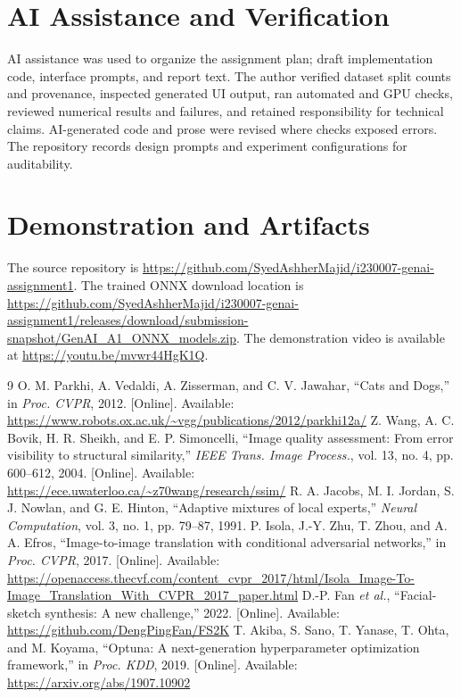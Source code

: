 \documentclass[conference]{IEEEtran}
\begin{document}
\appendices
\section{AI Assistance and Verification}
AI assistance was used to organize the assignment plan; draft implementation code, interface prompts, and report text. The author verified dataset split counts and provenance, inspected generated UI output, ran automated and GPU checks, reviewed numerical results and failures, and retained responsibility for technical claims. AI-generated code and prose were revised where checks exposed errors. The repository records design prompts and experiment configurations for auditability.

\section{Demonstration and Artifacts}
The source repository is \url{https://github.com/SyedAshherMajid/i230007-genai-assignment1}. The trained ONNX download location is \url{https://github.com/SyedAshherMajid/i230007-genai-assignment1/releases/download/submission-snapshot/GenAI_A1_ONNX_models.zip}. The demonstration video is available at \url{https://youtu.be/mvwr44HgK1Q}.

\begin{thebibliography}{9}
 O. M. Parkhi, A. Vedaldi, A. Zisserman, and C. V. Jawahar, ``Cats and Dogs,'' in \emph{Proc. CVPR}, 2012. [Online]. Available: \url{https://www.robots.ox.ac.uk/~vgg/publications/2012/parkhi12a/}
 Z. Wang, A. C. Bovik, H. R. Sheikh, and E. P. Simoncelli, ``Image quality assessment: From error visibility to structural similarity,'' \emph{IEEE Trans. Image Process.}, vol. 13, no. 4, pp. 600--612, 2004. [Online]. Available: \url{https://ece.uwaterloo.ca/~z70wang/research/ssim/}
 R. A. Jacobs, M. I. Jordan, S. J. Nowlan, and G. E. Hinton, ``Adaptive mixtures of local experts,'' \emph{Neural Computation}, vol. 3, no. 1, pp. 79--87, 1991.
 P. Isola, J.-Y. Zhu, T. Zhou, and A. A. Efros, ``Image-to-image translation with conditional adversarial networks,'' in \emph{Proc. CVPR}, 2017. [Online]. Available: \url{https://openaccess.thecvf.com/content_cvpr_2017/html/Isola_Image-To-Image_Translation_With_CVPR_2017_paper.html}
 D.-P. Fan \emph{et al.}, ``Facial-sketch synthesis: A new challenge,'' 2022. [Online]. Available: \url{https://github.com/DengPingFan/FS2K}
 T. Akiba, S. Sano, T. Yanase, T. Ohta, and M. Koyama, ``Optuna: A next-generation hyperparameter optimization framework,'' in \emph{Proc. KDD}, 2019. [Online]. Available: \url{https://arxiv.org/abs/1907.10902}
\end{thebibliography}
\end{document}
